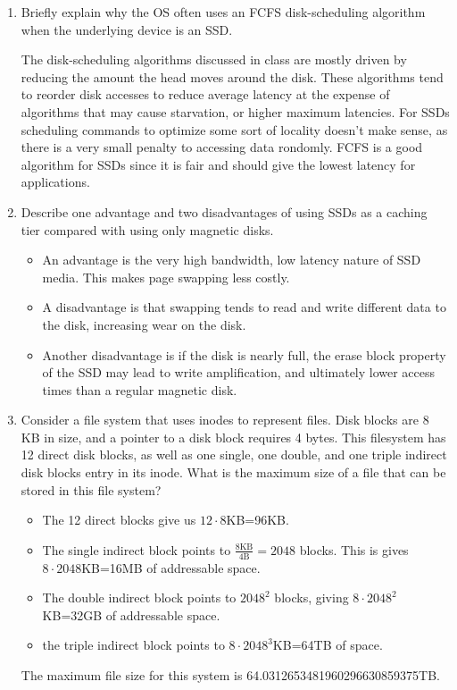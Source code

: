 \documentclass[a4paper, 11pt]{exam}
\begin{document}
\begin{enumerate}
\item Briefly explain why the OS often uses an FCFS disk-scheduling
  algorithm when the underlying device is an SSD.

  The disk-scheduling algorithms discussed in class are mostly driven
  by reducing the amount the head moves around the disk. These
  algorithms tend to reorder disk accesses to reduce average latency
  at the expense of algorithms that may cause starvation, or higher
  maximum latencies. For SSDs scheduling commands to optimize some
  sort of locality doesn't make sense, as there is a very small
  penalty to accessing data rondomly. FCFS is a good algorithm for
  SSDs since it is fair and should give the lowest latency for
  applications.

\item Describe one advantage and two disadvantages of using SSDs as a
  caching tier compared with using only magnetic disks.

\begin{itemize}
\item An advantage is the very high bandwidth, low latency nature of
  SSD media. This makes page swapping less costly.
\item A disadvantage is that swapping tends to read and write
  different data to the disk, increasing wear on the disk.
\item Another disadvantage is if the disk is nearly full, the erase
  block property of the SSD may lead to write amplification, and
  ultimately lower access times than a regular magnetic disk.
\end{itemize}
\item Consider a file system that uses inodes to represent files. Disk
  blocks are 8 KB in size, and a pointer to a disk block requires 4
  bytes. This filesystem has 12 direct disk blocks, as well as one
  single, one double, and one triple indirect disk blocks entry in its
  inode. What is the maximum size of a file that can be stored in this
  file system?

\begin{itemize}
\item The 12 direct blocks give us $12\cdot8$KB=96KB.
\item The single indirect block points to $\frac{8\text{KB}}{4\text{B}}=2048$ blocks. This is gives $8\cdot2048$KB=16MB of addressable space.
\item The double indirect block points to $2048^2$ blocks, giving $8\cdot2048^2$KB=32GB of addressable space.
\item the triple indirect block points to $8\cdot2048^3$KB=64TB of space.
\end{itemize}
The maximum file size for this system is 64.0312653481960296630859375TB.


\end{enumerate}
\end{document}

